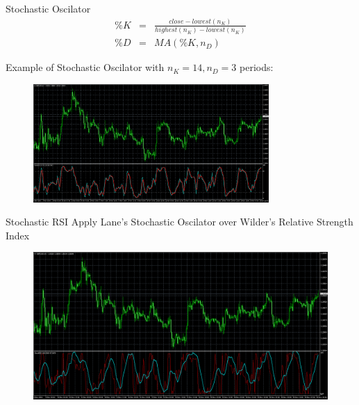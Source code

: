 \documentclass[12pt,portuguese]{beamer}
\begin{document}
\begin{frame}{Stochastic Oscilator}
\begin{equation*}
\begin{array}{rcl}
	\%K &=& \frac{close - lowest(n_K)}{highest(n_K) - lowest(n_K)}
\\
	\%D & = & MA(\%K, n_D)
\end{array}
\end{equation*}

	Example of Stochastic Oscilator\citep{Lane1984} with $n_K=14, n_D=3$ periods:
	\begin{figure}[H]
	\centering
	\includegraphics[width=0.8\textwidth]{images/mt4_stoch.png}
	\end{figure}
\end{frame}

\begin{frame}{Stochastic RSI}
	Apply Lane's Stochastic Oscilator over Wilder's Relative Strength Index

	\begin{figure}[H]
	\centering
	\includegraphics[width=\textwidth]{images/mt4_stochRSI.png}
	\end{figure}
\end{frame}
\end{document}
